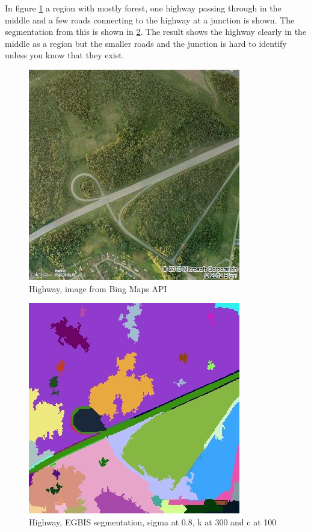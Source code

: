 In figure \ref{fig:roadOriginal} a region with mostly forest, one highway passing
through in the middle and a few roads connecting to the highway at a junction is shown.
The segmentation from this is shown in \ref{fig:roadEGBIS}. The result shows
the highway clearly in the middle as a region but the smaller roads and the junction
is hard to identify unless you know that they exist.
\begin{figure}[ht]
    \begin{minipage}[t]{\linewidth}
        \centering
        \includegraphics[width=\textwidth]{images/bing/road-original.jpg}
        \caption{Highway, image from Bing Maps API}
        \label{fig:roadOriginal}
    \end{minipage}
\end{figure}
\begin{figure}[ht]
    \begin{minipage}[t]{\linewidth}
        \centering
        \includegraphics[width=\textwidth]{images/bing/road-egbis.jpg}
        \caption{Highway, EGBIS segmentation, sigma at 0.8, k at 300 and c at 100}
        \label{fig:roadEGBIS}
    \end{minipage}
\end{figure}
